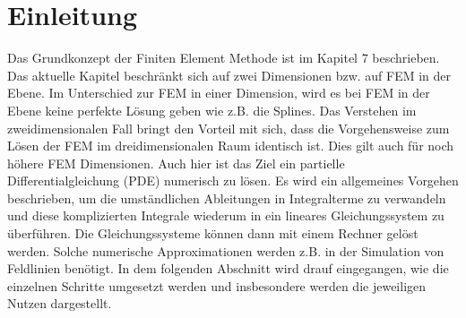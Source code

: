 %
%
%
\section{Einleitung\label{fem:section:einleitung}}
Das Grundkonzept der Finiten Element Methode ist im Kapitel 7 beschrieben. Das aktuelle Kapitel beschränkt sich auf zwei Dimensionen bzw. auf FEM in der Ebene. Im Unterschied zur FEM in einer Dimension, wird es bei FEM in der Ebene keine perfekte Lösung geben wie z.B. die Splines. Das Verstehen im zweidimensionalen Fall bringt den Vorteil mit sich, dass die Vorgehensweise zum Lösen der FEM im dreidimensionalen Raum identisch ist. Dies gilt auch für noch höhere FEM Dimensionen. Auch hier ist das Ziel ein partielle Differentialgleichung (PDE) numerisch zu lösen. Es wird ein allgemeines Vorgehen beschrieben, um die umständlichen Ableitungen in Integralterme zu verwandeln und diese komplizierten Integrale wiederum in ein lineares Gleichungssystem zu überführen. Die Gleichungssysteme können dann mit einem Rechner gelöst  werden. Solche numerische Approximationen werden z.B. in der Simulation von Feldlinien benötigt. 
In dem folgenden Abschnitt wird drauf eingegangen, wie die einzelnen Schritte umgesetzt werden und insbesondere werden die jeweiligen Nutzen dargestellt.

